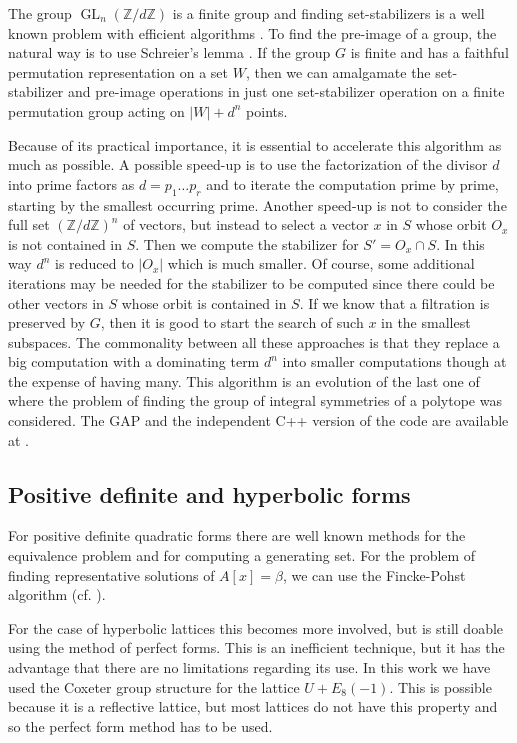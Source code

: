 \documentclass[a4paper,11pt]{article}
\newcommand{\ZZ}{\mathbb Z}
\newcommand{\GL}{\mathop{\mathrm {GL}}\nolimits}
\begin{document}
The group $\GL_n(\ZZ/d\ZZ)$ is a finite group and finding set-stabilizers is a well
known problem with efficient algorithms \cite{leon1,leon2,jefferson}.
To find the pre-image of a group, the natural way is to use  Schreier's lemma
\cite[Lemma 4.2.1]{Seress}.
If the group $G$ is finite and has a faithful permutation representation
on a set $W$, then we can amalgamate the set-stabilizer and pre-image operations
in just one set-stabilizer
operation on a finite permutation group acting on $|W| + d^n$ points.

Because of its practical importance, it is essential to accelerate this algorithm
as much as possible. A possible speed-up is to use the factorization of the divisor $d$
into prime factors as $d = p_1\dots p_r$ and to iterate the computation prime by prime,
starting by the smallest occurring prime.
Another speed-up is not to consider the full set $(\ZZ / d \ZZ)^n$ of vectors, but instead
to select a vector $x$ in $S$ whose orbit $O_x$ is not contained in $S$. Then we compute
 the stabilizer for $S' = O_x\cap S$.
In this way $d^n$ is reduced to $\left\vert O_x \right\vert$ which is much smaller. Of course,
some additional iterations may be needed for the stabilizer to be computed since there could
be other vectors in $S$ whose orbit is contained in $S$.
If we know that a filtration is preserved by $G$, then it is good to start
the search of such $x$ in the smallest subspaces. The commonality between all these
approaches is that they replace a big computation with a dominating term $d^n$ into
smaller computations though at the expense of having many.
This algorithm is an evolution of the last one of \cite[Section 3.1]{BDPRS} where the
problem of finding the group of integral symmetries of a polytope was considered.
The GAP and the independent C++ version of the code are available at \cite{Polyhedral}.

\subsection{Positive definite and hyperbolic forms}\label{subsection_posdef_hyperbolic}
For positive definite quadratic forms there are well known methods \cite{plesken} for the equivalence
problem and for computing a generating set.
For the problem of finding representative solutions of $A[x] = \beta$, we can use the
Fincke-Pohst algorithm (cf. \cite[Algorithm~2.7.7]{cohen}).

For the case of hyperbolic lattices this becomes more involved, but is still doable using
the method of perfect forms. This is an inefficient technique, but it has the advantage that there are no limitations
regarding its use.
In this work we have used the Coxeter group structure for the lattice $U + E_8(-1)$.
This is possible because it is a reflective lattice, but most lattices do not have this property and so the perfect form method has to be used.
\end{document}
